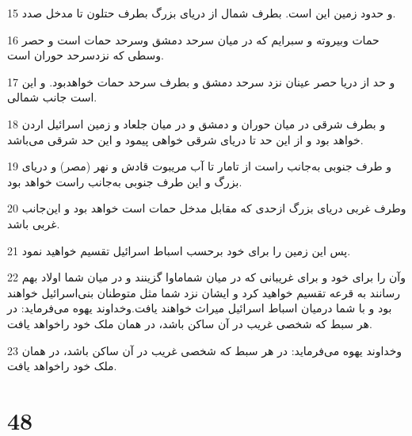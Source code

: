\par 15 و حدود زمین این است. بطرف شمال از دریای بزرگ بطرف حتلون تا مدخل صدد.
\par 16 حمات وبیروته و سبرایم که در میان سرحد دمشق وسرحد حمات است و حصر وسطی که نزدسرحد حوران است.
\par 17 و حد از دریا حصر عینان نزد سرحد دمشق و بطرف سرحد حمات خواهدبود. و این است جانب شمالی.
\par 18 و بطرف شرقی در میان حوران و دمشق و در میان جلعاد و زمین اسرائیل اردن خواهد بود و از این حد تا دریای شرقی خواهی پیمود و این حد شرقی می‌باشد.
\par 19 و طرف جنوبی به‌جانب راست از تامار تا آب مریبوت قادش و نهر (مصر) و دریای بزرگ و این طرف جنوبی به‌جانب راست خواهد بود.
\par 20 وطرف غربی دریای بزرگ ازحدی که مقابل مدخل حمات است خواهد بود و این‌جانب غربی باشد.
\par 21 پس این زمین را برای خود برحسب اسباط اسرائیل تقسیم خواهید نمود.
\par 22 وآن را برای خود و برای غریبانی که در میان شماماوا گزینند و در میان شما اولاد بهم رسانند به قرعه تقسیم خواهید کرد و ایشان نزد شما مثل متوطنان بنی‌اسرائیل خواهند بود و با شما درمیان اسباط اسرائیل میراث خواهند یافت.وخداوند یهوه می‌فرماید: در هر سبط که شخصی غریب در آن ساکن باشد، در همان ملک خود راخواهد یافت.
\par 23 وخداوند یهوه می‌فرماید: در هر سبط که شخصی غریب در آن ساکن باشد، در همان ملک خود راخواهد یافت.

\chapter{48}


